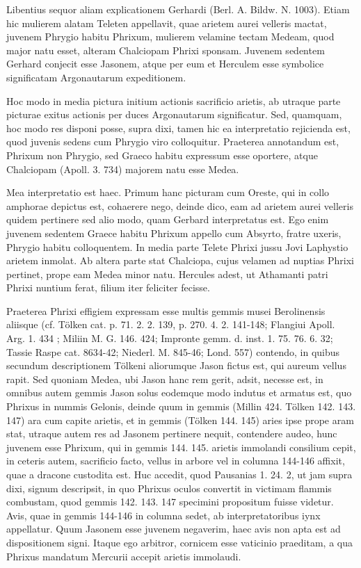 \documentclass[landscape, a4paper, 11pt, oneside, polutonikogreek, german]{article}
\begin{document}
Libentius sequor aliam explicationem Gerhardi (Berl. A. Bildw. N. 1003). Etiam hic mulierem alatam Teleten appellavit, quae arietem aurei velleris mactat, juvenem Phrygio habitu Phrixum, mulierem velamine tectam Medeam, quod major natu esset, alteram Chalciopam Phrixi sponsam. Juvenem sedentem Gerhard conjecit esse Jasonem, atque per eum et Herculem esse symbolice significatam Argonautarum expeditionem.

Hoc modo in media pictura initium actionis sacrificio arietis, ab utraque parte picturae exitus actionis per duces Argonautarum significatur. Sed, quamquam, hoc modo res disponi posse, supra dixi, tamen hic ea interpretatio rejicienda est, quod juvenis sedens cum Phrygio viro colloquitur. Praeterea annotandum est, Phrixum non Phrygio, sed Graeco habitu expressum esse oportere, atque Chalciopam (Apoll. 3. 734) majorem natu esse Medea.

Mea interpretatio est haec. Primum hanc picturam cum Oreste, qui in collo amphorae depictus est, cohaerere nego, deinde dico, eam ad arietem aurei velleris quidem pertinere sed alio modo, quam Gerbard interpretatus est. Ego enim juvenem sedentem Graece habitu Phrixum appello cum Absyrto, fratre uxeris, Phrygio habitu colloquentem. In media parte Telete Phrixi jussu Jovi Laphystio arietem inmolat. Ab altera parte stat Chalciopa, cujus velamen ad nuptias Phrixi pertinet, prope eam Medea minor natu. Hercules adest, ut Athamanti patri Phrixi nuntium ferat, filium iter feliciter fecisse.

Praeterea Phrixi effigiem expressam esse multis gemmis musei Berolinensis aliisque (cf. Tölken cat. p. 71. 2. 2. 139, p. 270. 4. 2. 141-148; Flangiui Apoll. Arg. 1. 434 ; Miliin M. G. 146. 424; Impronte gemm. d. inst. 1. 75. 76. 6. 32; Tassie Raspe cat. 8634-42; Niederl. M. 845-46; Lond. 557) contendo, in quibus secundum descriptionem Tölkeni aliorumque Jason fictus est, qui aureum vellus rapit. Sed quoniam Medea, ubi Jason hanc rem gerit, adsit, necesse est, in omnibus autem gemmis Jason solus eodemque modo indutus et armatus est, quo Phrixus in nummis Gelonis, deinde quum in gemmis (Millin 424. Tölken 142. 143. 147) ara cum capite arietis, et in gemmis (Tölken 144. 145) aries ipse prope aram stat, utraque autem res ad Jasonem pertinere nequit, contendere audeo, hunc juvenem esse Phrixum, qui in gemmis 144. 145. arietis immolandi consilium cepit, in ceteris autem, sacrificio facto, vellus in arbore vel in columna 144-146 affixit, quae a dracone custodita est. Huc accedit, quod Pausanias 1. 24. 2, ut jam supra dixi, signum descripsit, in quo Phrixus oculos convertit in victimam flammis combustam, quod gemmis 142. 143. 147 specimini propositum fuisse videtur. Avis, quae in gemmis 144-146 in columna sedet, ab interpretatoribus iynx appellatur. Quum Jasonem esse juvenem negaverim, haec avis non apta est ad dispositionem signi. Itaque ego arbitror, cornicem esse vaticinio praeditam, a qua Phrixus mandatum Mercurii accepit arietis immolaudi.
\end{document}
